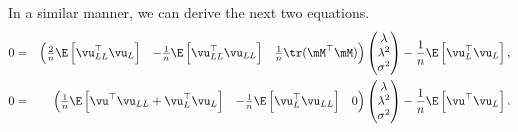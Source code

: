 \documentclass[english,12pt]{book}\usepackage[]{graphicx}\usepackage[]{xcolor}
\begin{document}
In a similar manner, we can derive the next two equations. 
\begin{eqnarray}
 0 & = & \begin{pmatrix}
            \frac{2}{n}\E\left[\vu^\top_{LL}\vu_L\right] & -\frac{1}{n}\E\left[\vu_{LL}^\top\vu_{LL}\right] & \frac{1}{n} \tr(\mM^\top\mM)
          \end{pmatrix}
                      \begin{pmatrix}
              \lambda \\
              \lambda^2 \\
              \sigma^2
            \end{pmatrix} - \frac{1}{n}\E\left[\vu^\top_L\vu_L\right]\label{eq:Pequation_2_gmm}, \\
 0 & = & \begin{pmatrix}
            \frac{1}{n}\E\left[\vu^\top\vu_{LL} + \vu_L^\top\vu_L\right] & - \frac{1}{n}\E\left[\vu_{L}^\top\vu_{LL}\right] & 0
          \end{pmatrix}
                      \begin{pmatrix}
              \lambda \\
              \lambda^2 \\
              \sigma^2
            \end{pmatrix} - \frac{1}{n}\E\left[\vu^\top\vu_L\right].\label{eq:Pequation_3_gmm}
\end{eqnarray}
\end{document}
